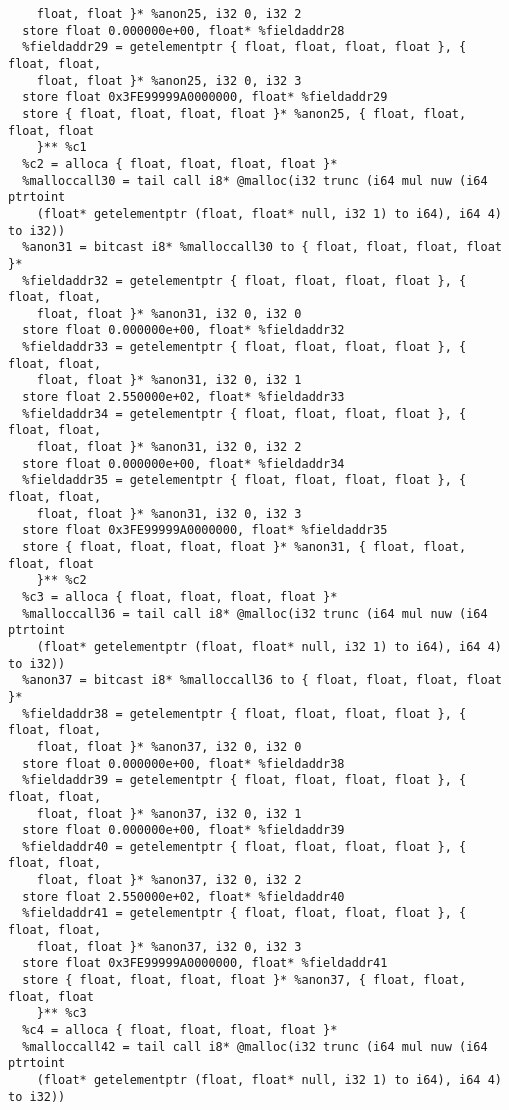 \documentclass[main.tex]{subfiles}
\begin{document}
{\begin{lstlisting}
    float, float }* %anon25, i32 0, i32 2
  store float 0.000000e+00, float* %fieldaddr28
  %fieldaddr29 = getelementptr { float, float, float, float }, { float, float, 
    float, float }* %anon25, i32 0, i32 3
  store float 0x3FE99999A0000000, float* %fieldaddr29
  store { float, float, float, float }* %anon25, { float, float, float, float 
    }** %c1
  %c2 = alloca { float, float, float, float }*
  %malloccall30 = tail call i8* @malloc(i32 trunc (i64 mul nuw (i64 ptrtoint 
    (float* getelementptr (float, float* null, i32 1) to i64), i64 4) to i32))
  %anon31 = bitcast i8* %malloccall30 to { float, float, float, float }*
  %fieldaddr32 = getelementptr { float, float, float, float }, { float, float, 
    float, float }* %anon31, i32 0, i32 0
  store float 0.000000e+00, float* %fieldaddr32
  %fieldaddr33 = getelementptr { float, float, float, float }, { float, float, 
    float, float }* %anon31, i32 0, i32 1
  store float 2.550000e+02, float* %fieldaddr33
  %fieldaddr34 = getelementptr { float, float, float, float }, { float, float, 
    float, float }* %anon31, i32 0, i32 2
  store float 0.000000e+00, float* %fieldaddr34
  %fieldaddr35 = getelementptr { float, float, float, float }, { float, float, 
    float, float }* %anon31, i32 0, i32 3
  store float 0x3FE99999A0000000, float* %fieldaddr35
  store { float, float, float, float }* %anon31, { float, float, float, float 
    }** %c2
  %c3 = alloca { float, float, float, float }*
  %malloccall36 = tail call i8* @malloc(i32 trunc (i64 mul nuw (i64 ptrtoint 
    (float* getelementptr (float, float* null, i32 1) to i64), i64 4) to i32))
  %anon37 = bitcast i8* %malloccall36 to { float, float, float, float }*
  %fieldaddr38 = getelementptr { float, float, float, float }, { float, float, 
    float, float }* %anon37, i32 0, i32 0
  store float 0.000000e+00, float* %fieldaddr38
  %fieldaddr39 = getelementptr { float, float, float, float }, { float, float, 
    float, float }* %anon37, i32 0, i32 1
  store float 0.000000e+00, float* %fieldaddr39
  %fieldaddr40 = getelementptr { float, float, float, float }, { float, float, 
    float, float }* %anon37, i32 0, i32 2
  store float 2.550000e+02, float* %fieldaddr40
  %fieldaddr41 = getelementptr { float, float, float, float }, { float, float, 
    float, float }* %anon37, i32 0, i32 3
  store float 0x3FE99999A0000000, float* %fieldaddr41
  store { float, float, float, float }* %anon37, { float, float, float, float 
    }** %c3
  %c4 = alloca { float, float, float, float }*
  %malloccall42 = tail call i8* @malloc(i32 trunc (i64 mul nuw (i64 ptrtoint 
    (float* getelementptr (float, float* null, i32 1) to i64), i64 4) to i32))

\end{lstlisting}}
\end{document}
